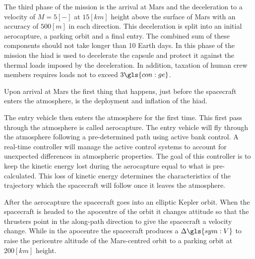 The third phase of the mission is the arrival at Mars and the deceleration to a velocity of $M=5 \left[-\right]$ at $15 \left[km\right]$ height above the surface of Mars with an accuracy of $500 \left[m\right]$ in each direction. This deceleration is split into an initial aerocapture, a parking orbit and a final entry. The combined sum of these components should not take longer than 10 Earth days. In this phase of the mission the \gls{hiad} is used to decelerate the capsule and protect it against the thermal loads imposed by the deceleration. In addition, taxation of human crew members requires loads not to exceed $3\gls{con:ge}$.

Upon arrival at Mars the first thing that happens, just before the spacecraft enters the atmosphere, is the deployment and inflation of the \gls{hiad}. %

The entry vehicle then enters the atmosphere for the first time. This first pass through the atmosphere is called aerocapture. The entry vehicle will fly through the atmosphere following a pre-determined path using active bank control. A real-time controller will manage the active control systems to account for unexpected differences in atmospheric properties. The goal of this controller is to keep the kinetic energy lost during the aerocapture equal to what is pre-calculated. This loss of kinetic energy determines the characteristics of the trajectory which the spacecraft will follow once it leaves the atmosphere. %

After the aerocapture the spacecraft goes into an elliptic Kepler orbit. When the spacecraft is headed to the apocentre of the orbit it changes attitude so that the thrusters point in the along-path direction to give the spacecraft a velocity change. While in the apocentre the spacecraft produces a $\Delta\gls{sym:V}$ to raise the pericentre altitude of the Mars-centred orbit to a parking orbit at $200 \left[km\right]$ height.

